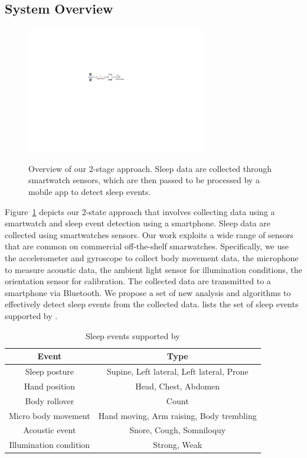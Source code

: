 \subsection{System Overview}

\begin{figure}
  \centering
  \includegraphics[width=0.7\textwidth]{figures/overviewd.pdf}\\
  \caption{Overview of our 2-stage approach. Sleep data are collected through smartwatch sensors, which are then passed to be processed by a mobile app
  to detect sleep events.}\label{fig:overview}
\end{figure}

Figure~\ref {fig:overview} depicts our 2-state approach that involves collecting data using a smartwatch and sleep event detection using a
smartphone. Sleep data are collected using smartwatches sensors. Our work exploits a wide range of sensors that are common on commercial
off-the-shelf smarwatches. Specifically, we use the accelerometer and gyroscope to collect body movement data, the microphone to measure
acoustic data, the ambient light sensor for illumination conditions, the orientation sensor for calibration. The collected data are
transmitted to a smartphone via Bluetooth. We propose a set of new analysis and algorithms to effectively detect sleep events from the
collected data.  lists the set of sleep events supported by \systemname.

\begin{table}[htbp]
 \caption{\label{tab:test}Sleep events supported by \systemname}
 \centering
 \begin{tabular}{cc}
  \hline
  \textbf{Event}& \textbf{Type} \\
 \hline
 Sleep posture & Supine, Left lateral, Left lateral, Prone\\
 Hand position & Head, Chest, Abdomen\\
 Body rollover & Count\\
 Micro body movement& Hand moving, Arm raising, Body trembling \\
 Acoustic event & Snore, Cough, Somniloquy  \\
 Illumination condition & Strong, Weak  \\
 \hline
 \end{tabular}
\end{table}

